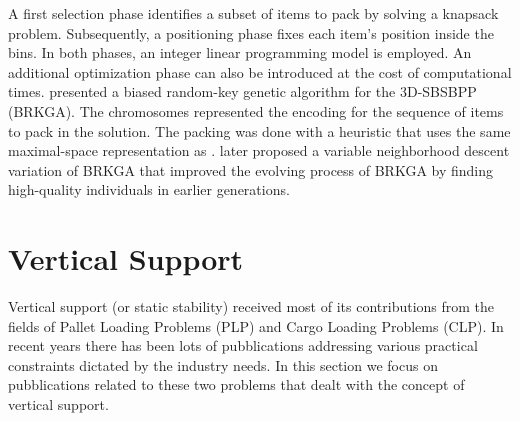 A first selection phase identifies a subset of items to pack by solving a knapsack problem. Subsequently, a positioning phase fixes each item's position inside the bins.
In both phases, an integer linear programming model is employed. An additional optimization phase can also be introduced at the cost of computational times.
\cite{gonccalves2013biased} presented a biased random-key genetic algorithm for the 3D-SBSBPP (BRKGA).
The chromosomes represented the encoding for the sequence of items to pack in the solution.
The packing was done with a heuristic that uses the same maximal-space representation as \cite{parreno2010hybrid}.
\cite{zudio2018brkga} later proposed a variable neighborhood descent variation of BRKGA that improved the evolving process of BRKGA by finding high-quality individuals in earlier generations.

\section{Vertical Support}
\label{sec:literature:support}%
Vertical support (or static stability) received most of its contributions from the fields of Pallet Loading Problems (PLP) and Cargo Loading Problems (CLP).
In recent years there has been lots of pubblications addressing various practical constraints dictated by the industry needs.
In this section we focus on pubblications related to these two problems that dealt with the concept of vertical support.

